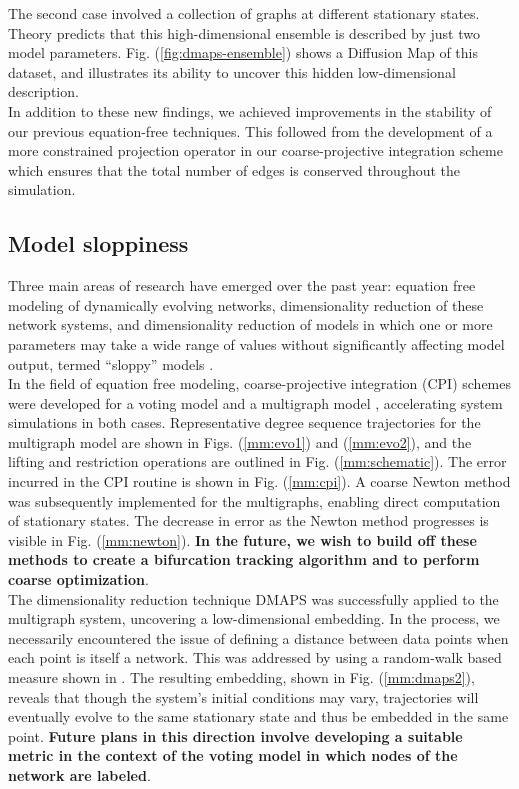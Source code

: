 \documentclass[12pt]{article}
\begin{document}
\begin{spacing}{2}
The second case involved a collection of graphs at different
stationary states. Theory predicts that this high-dimensional ensemble
is described by just two model
parameters. Fig. (\ref{fig:dmaps-ensemble}) shows a Diffusion Map of
this dataset, and illustrates its ability to uncover this hidden
low-dimensional description. \\

In addition to these new findings, we achieved improvements in the
stability of our previous equation-free techniques. This followed from
the development of a more constrained projection operator in our
coarse-projective integration scheme which ensures that the total
number of edges is conserved throughout the simulation.

\subsection*{Model sloppiness}



\indent Three main areas of research have emerged over the past year:
equation free modeling of dynamically evolving networks,
dimensionality reduction of these network systems, and dimensionality
reduction of models in which one or more parameters may take a wide
range of values without significantly affecting model output, termed
``sloppy'' models \cite{Gutenkunst2007}. \\

\indent In the field of equation free modeling, coarse-projective
integration (CPI) schemes were developed for a voting model and a
multigraph model \cite{Rath2012} \cite{Durrett2012}, accelerating
system simulations in both cases. Representative degree sequence
trajectories for the multigraph model are shown in
Figs. (\ref{mm:evo1}) and (\ref{mm:evo2}), and the lifting and
restriction operations are outlined in Fig. (\ref{mm:schematic}). The
error incurred in the CPI routine is shown in Fig. (\ref{mm:cpi}). A
coarse Newton method was subsequently implemented for the multigraphs,
enabling direct computation of stationary states. The decrease in
error as the Newton method progresses is visible in
Fig. (\ref{mm:newton}). \textbf{In the future, we wish to build off
  these methods to create a bifurcation tracking algorithm and to
  perform coarse optimization}. \\

\indent The dimensionality reduction technique DMAPS was successfully
applied to the multigraph system, uncovering a low-dimensional
embedding. In the process, we necessarily encountered the issue of
defining a distance between data points when each point is itself a
network. This was addressed by using a random-walk based measure shown
in \cite{Rajendran2013}. The resulting embedding, shown in
Fig. (\ref{mm:dmaps2}), reveals that though the system's initial
conditions may vary, trajectories will eventually evolve to the same
stationary state and thus be embedded in the same
point. \textbf{Future plans in this direction involve developing a
  suitable metric in the context of the voting model in which nodes of
  the network are labeled}. \\


\end{spacing}
\end{document}
